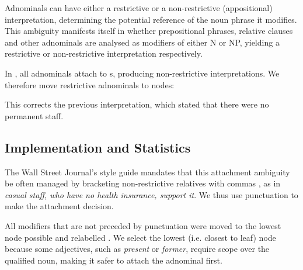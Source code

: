 \documentclass[11pt]{article}
\begin{document}
Adnominals can have either a restrictive or a non-restrictive (appositional)
interpretation, determining the potential reference of the noun phrase it
modifies. This ambiguity manifests itself in whether prepositional phrases,
relative clauses and other adnominals are analysed as modifiers of either N or NP,
yielding a restrictive or non-restrictive interpretation respectively.

In \ccgbank, all adnominals  attach to s, producing
non-restrictive interpretations. We therefore move restrictive adnominals
to  nodes:

\begin{center}
\end{center}

This corrects the previous interpretation, which stated
that there were no permanent staff.

\subsection{Implementation and Statistics}
\label{sec:restrictivity_implementation}
The Wall Street Journal's style guide mandates that 
this attachment ambiguity be often managed by bracketing
non-restrictive relatives with commas \citep[p. 82]{martin:02},
as in \emph{casual staff, who have no health insurance, support it}.
We thus use punctuation to make the attachment decision.

All  modifiers that are not preceded by punctuation were
moved to the lowest  node possible and relabelled . We select
the lowest (i.e. closest to leaf)  node because some adjectives, such as
\emph{present} or \emph{former}, require scope over the qualified noun, making
it safer to attach the adnominal first.
\end{document}
